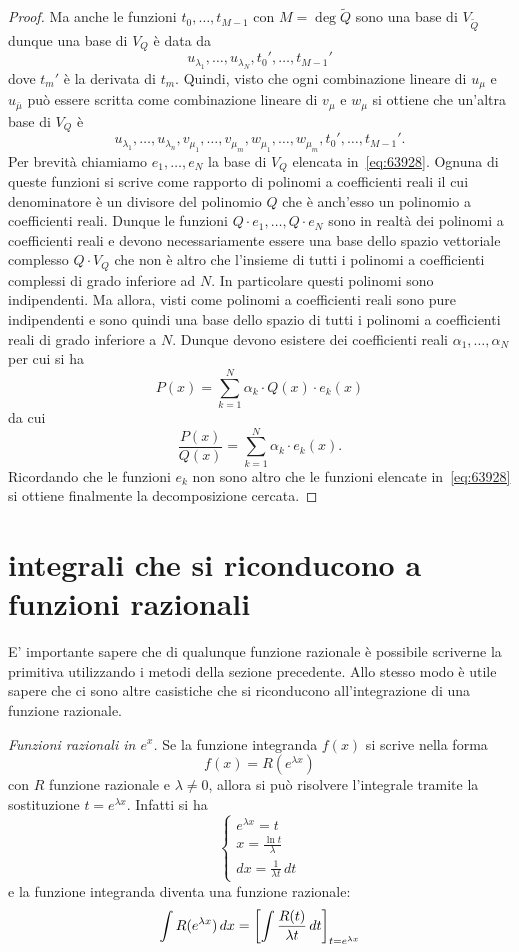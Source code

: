 \begin{proof}
Ma anche le funzioni $t_0, \dots, t_{M-1}$ con $M=\deg \tilde Q$
sono una base di $V_{\tilde Q}$ dunque una base
di $V_Q$ è data da
\[
  u_{\lambda_1}, \dots, u_{\lambda_N},
  t_0', \dots, t_{M-1}'
\]
dove $t_m'$ è la derivata di $t_m$.
Quindi, visto che ogni combinazione lineare
di $u_{\mu}$ e $u_{\bar \mu}$ può essere scritta
come combinazione lineare di $v_\mu$ e $w_\mu$
si ottiene che un'altra base di $V_Q$ è
\begin{equation}\label{eq:63928}
  u_{\lambda_1}, \dots, u_{\lambda_n},
  v_{\mu_1}, \dots, v_{\mu_m},
  w_{\mu_1}, \dots, w_{\mu_m},
  t_0', \dots, t_{M-1}'.
\end{equation}
Per brevità chiamiamo $e_1, \dots, e_N$
la base di $V_Q$ elencata in~\eqref{eq:63928}.
Ognuna di queste funzioni si scrive come
rapporto di polinomi a coefficienti reali
il cui denominatore è un divisore del polinomio $Q$
che è anch'esso un polinomio a coefficienti reali.
Dunque le funzioni $Q\cdot e_1, \dots, Q\cdot e_N$
sono in realtà dei polinomi a coefficienti reali
e devono necessariamente essere una base dello spazio
vettoriale complesso $Q\cdot V_Q$ che non è altro che l'insieme
di tutti i polinomi a coefficienti complessi
di grado inferiore ad $N$. In particolare questi polinomi
sono indipendenti.
Ma allora, visti come polinomi a
coefficienti reali sono pure indipendenti e sono quindi
una base dello spazio di tutti i polinomi a coefficienti reali
di grado inferiore a $N$.
Dunque devono esistere dei coefficienti reali $\alpha_1, \dots, \alpha_N$
per cui si ha
\[
  P(x) = \sum_{k=1}^N \alpha_k\cdot Q(x)\cdot e_k(x)
\]
da cui
\[
  \frac{P(x)}{Q(x)} = \sum_{k=1}^N \alpha_k \cdot e_k(x).
\]
Ricordando che le funzioni $e_k$ non sono altro che le funzioni
elencate in~\eqref{eq:63928} si ottiene finalmente la decomposizione
cercata.
\end{proof}

\section{integrali che si riconducono a funzioni razionali}

E' importante sapere che di qualunque funzione razionale è possibile
scriverne la primitiva utilizzando i metodi della sezione precedente.
Allo stesso modo è utile sapere che ci sono altre casistiche che si
riconducono all'integrazione di una funzione razionale.

\emph{Funzioni razionali in $e^x$.}
Se la funzione integranda $f(x)$ si scrive nella forma
\[
  f(x) = R(e^{\lambda x})
\]
con $R$ funzione razionale e $\lambda\neq 0$,
allora si può risolvere l'integrale tramite la
sostituzione $t = e^{\lambda x}$. Infatti si ha
\[
\begin{cases}
 e^{\lambda x} = t\\
 x = \frac{\ln t}{\lambda}\\
 dx = \frac{1}{\lambda t}\, dt
 \end{cases}
\]
e la funzione integranda diventa una funzione razionale:
\[
 \int R(e^{\lambda x})\, dx = {\left[ \int \frac{R(t)}{\lambda t}\, dt \right]}_{t=e^{\lambda x}}
\]

